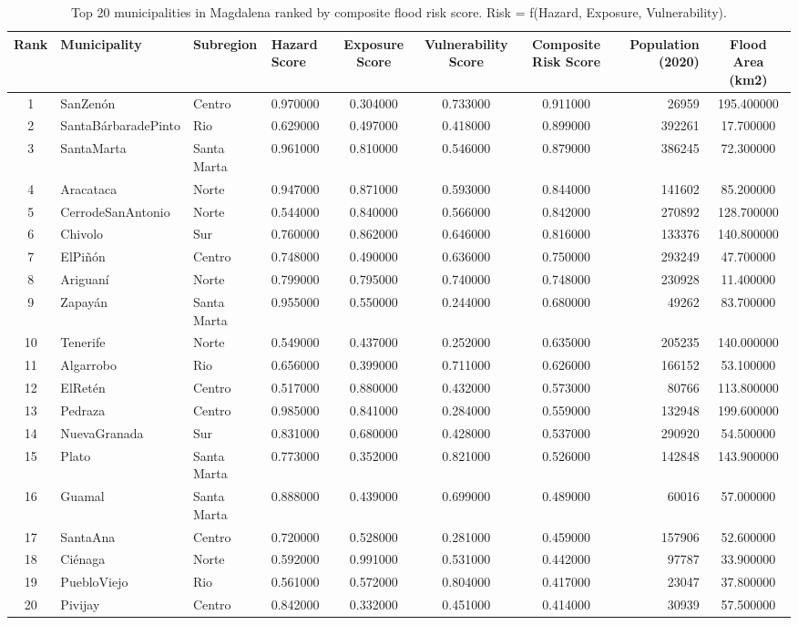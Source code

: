 \begin{table}[htbp]
\caption{Top 20 municipalities in Magdalena ranked by composite flood risk score. Risk = f(Hazard, Exposure, Vulnerability).}
\label{tab:municipal_risk}
\begin{tabular}{clllcccrc}
\toprule
Rank & Municipality & Subregion & Hazard Score & Exposure Score & Vulnerability Score & Composite Risk Score & Population (2020) & Flood Area (km2) \\
\midrule
1 & SanZenón & Centro & 0.970000 & 0.304000 & 0.733000 & 0.911000 & 26959 & 195.400000 \\
2 & SantaBárbaradePinto & Rio & 0.629000 & 0.497000 & 0.418000 & 0.899000 & 392261 & 17.700000 \\
3 & SantaMarta & Santa Marta & 0.961000 & 0.810000 & 0.546000 & 0.879000 & 386245 & 72.300000 \\
4 & Aracataca & Norte & 0.947000 & 0.871000 & 0.593000 & 0.844000 & 141602 & 85.200000 \\
5 & CerrodeSanAntonio & Norte & 0.544000 & 0.840000 & 0.566000 & 0.842000 & 270892 & 128.700000 \\
6 & Chivolo & Sur & 0.760000 & 0.862000 & 0.646000 & 0.816000 & 133376 & 140.800000 \\
7 & ElPiñón & Centro & 0.748000 & 0.490000 & 0.636000 & 0.750000 & 293249 & 47.700000 \\
8 & Ariguaní & Norte & 0.799000 & 0.795000 & 0.740000 & 0.748000 & 230928 & 11.400000 \\
9 & Zapayán & Santa Marta & 0.955000 & 0.550000 & 0.244000 & 0.680000 & 49262 & 83.700000 \\
10 & Tenerife & Norte & 0.549000 & 0.437000 & 0.252000 & 0.635000 & 205235 & 140.000000 \\
11 & Algarrobo & Rio & 0.656000 & 0.399000 & 0.711000 & 0.626000 & 166152 & 53.100000 \\
12 & ElRetén & Centro & 0.517000 & 0.880000 & 0.432000 & 0.573000 & 80766 & 113.800000 \\
13 & Pedraza & Centro & 0.985000 & 0.841000 & 0.284000 & 0.559000 & 132948 & 199.600000 \\
14 & NuevaGranada & Sur & 0.831000 & 0.680000 & 0.428000 & 0.537000 & 290920 & 54.500000 \\
15 & Plato & Santa Marta & 0.773000 & 0.352000 & 0.821000 & 0.526000 & 142848 & 143.900000 \\
16 & Guamal & Santa Marta & 0.888000 & 0.439000 & 0.699000 & 0.489000 & 60016 & 57.000000 \\
17 & SantaAna & Centro & 0.720000 & 0.528000 & 0.281000 & 0.459000 & 157906 & 52.600000 \\
18 & Ciénaga & Norte & 0.592000 & 0.991000 & 0.531000 & 0.442000 & 97787 & 33.900000 \\
19 & PuebloViejo & Rio & 0.561000 & 0.572000 & 0.804000 & 0.417000 & 23047 & 37.800000 \\
20 & Pivijay & Centro & 0.842000 & 0.332000 & 0.451000 & 0.414000 & 30939 & 57.500000 \\
\bottomrule
\end{tabular}
\end{table}
